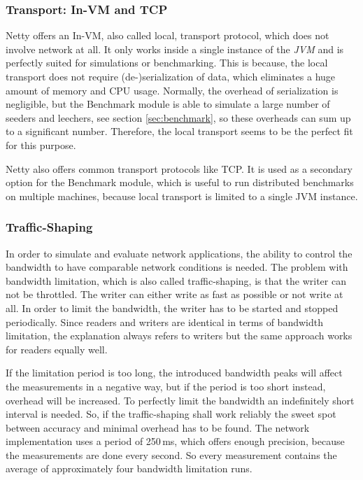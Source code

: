 \subsubsection{Transport: In-VM and TCP}
\label{subsubsec:transport}
Netty offers an In-VM, also called local, transport protocol, which does not involve network at all. It only works inside a single instance of the \emph{JVM} and is perfectly suited for simulations or benchmarking. This is because, the local transport does not require (de-)serialization of data, which eliminates a huge amount of memory and CPU usage. Normally, the overhead of serialization is negligible, but the Benchmark module is able to simulate a large number of seeders and leechers, see section \ref{sec:benchmark}, so these overheads can sum up to a significant number. Therefore, the local transport seems to be the perfect fit for this purpose.

Netty also offers common transport protocols like TCP. It is used as a secondary option for the Benchmark module, which is useful to run distributed benchmarks on multiple machines, because local transport is limited to a single JVM instance.


\subsubsection{Traffic-Shaping}
In order to simulate and evaluate network applications, the ability to control the bandwidth to have comparable network conditions is needed. The problem with bandwidth limitation, which is also called traffic-shaping, is that the writer can not be throttled. The writer can either write as fast as possible or not write at all. In order to limit the bandwidth, the writer has to be started and stopped periodically. Since readers and writers are identical in terms of bandwidth limitation, the explanation always refers to writers but the same approach works for readers equally well.

If the limitation period is too long, the introduced bandwidth peaks will affect the measurements in a negative way, but if the period is too short instead, overhead will be increased. To perfectly limit the bandwidth an indefinitely short interval is needed. So, if the traffic-shaping shall work reliably the sweet spot between accuracy and minimal overhead has to be found. The network implementation uses a period of 250\,ms, which offers enough precision, because the measurements are done every second. So every measurement contains the average of approximately four bandwidth limitation runs.

